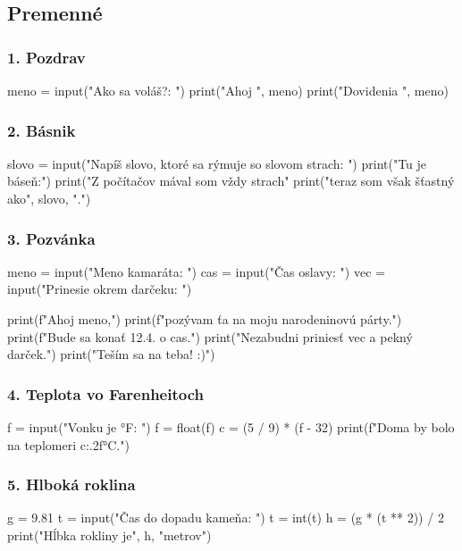 \subsection{Premenné}
\subsubsection*{1. Pozdrav}
\begin{solution}
meno = input("Ako sa voláš?: ")
print("Ahoj ", meno)
print("Dovidenia ", meno)
\end{solution}

\subsubsection*{2. Básnik}
\begin{solution}
slovo = input("Napíš slovo, ktoré sa rýmuje so slovom strach: ")
print("Tu je báseň:")
print("Z počítačov mával som vždy strach"
print("teraz som však šťastný ako", slovo, ".")
\end{solution}

\subsubsection*{3. Pozvánka}
\begin{solution}
meno = input("Meno kamaráta: ")
cas = input("Čas oslavy: ")
vec = input("Prinesie okrem darčeku: ")

print(f"Ahoj {meno},")
print(f"pozývam ťa na moju narodeninovú párty.")
print(f"Bude sa konať 12.4. o {cas}.")
print("Nezabudni priniesť {vec} a pekný darček.")
print("Teším sa na teba! :)")
\end{solution}

\subsubsection*{4. Teplota vo Farenheitoch}
\begin{solution}
f = input("Vonku je °F: ")
f = float(f)
c = (5 / 9) * (f - 32)
print(f"Doma by bolo na teplomeri {c:.2f}°C.")
\end{solution}

\subsubsection*{5. Hlboká roklina}
\begin{solution}
g = 9.81
t = input("Čas do dopadu kameňa: ")
t = int(t)
h = (g * (t ** 2)) / 2
print("Hĺbka rokliny je", h, "metrov")
\end{solution}

